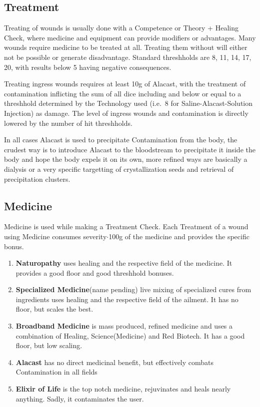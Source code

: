 \subsection{Treatment}\label{subsec:treatment}
Treating of wounds is usually done with a Competence or Theory + Healing Check, where medicine and equipment
can provide modifiers or advantages.
Many wounds require medicine to be treated at all.
Treating them without will either not be possible or generate disadvantage.
Standard threshholds are 8, 11, 14, 17, 20, with results below 5 having negative consequences.

Treating ingress wounds requires at least 10g of Alacast, with the treatment of
contamination inflicting the sum of all dice including and below or equal to a threshhold determined by the
Technology used (i.e.\ 8 for Saline-Alacast-Solution Injection) as damage.
The level of ingress wounds and contamination is directly lowered by the number of hit threshholds.

In all cases Alacast is used to precipitate Contamination from the body, the
crudest way is to introduce Alacast to the bloodstream to precipitate it inside the body and hope the body expels
it on its own, more refined ways are basically a dialysis or a very specific targetting of crystallization seeds
and retrieval of precipitation clusters.

\subsection{Medicine}\label{subsec:medicine}
Medicine is used while making a Treatment Check.
Each Treatment of a wound using Medicine consumes
severity\(\cdot\)100g of the medicine and provides the specific bonus.

\begin{enumerate}[label= -]
    \item \textbf{Naturopathy} uses healing and the respective field of the medicine.
    It provides a good floor and good threshhold bonuses.
    \item \textbf{Specialized Medicine}(name pending) live mixing of specialized cures from ingredients
    uses healing and the respective field of the ailment.
    It has no floor, but scales the best.
    \item \textbf{Broadband Medicine} is mass produced, refined medicine and uses a com\-bi\-nation of
    Healing, \-Scie\-nce(Med\-icine) and \-Red Biotech.
    It has a good \-floor, but low \-scaling.
    \item \textbf{Alacast} has no direct medicinal benefit, but effectively combats Contamination in all fields
    \item \textbf{Elixir of Life} is the top notch medicine, rejuvinates and heals nearly anything.
    Sadly, it contaminates the user.
\end{enumerate}

